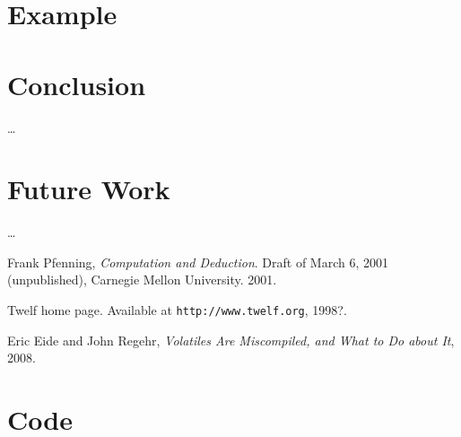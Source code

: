 \section{Example}


\section{Conclusion}

\ldots

\section{Future Work}


\ldots

\clearpage

\begin{thebibliography}{9}

Frank Pfenning, \textit{Computation and Deduction}. Draft of March 6, 2001 (unpublished), Carnegie Mellon University. 2001.

Twelf home page. Available at \texttt{http://www.twelf.org}, 1998?.

Eric Eide and John Regehr, \textit{Volatiles Are Miscompiled, and What to Do about It}, 2008.

\end{thebibliography}


\appendix

\section{Code}
\label{sec:code}
